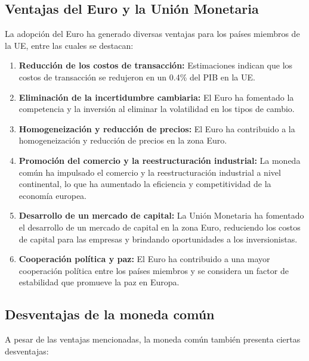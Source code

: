\documentclass[
  jou,
  floatsintext,
  longtable,
  a4paper,
  nolmodern,
  notxfonts,
  notimes,
  12pt,
  colorlinks=true,linkcolor=blue,citecolor=blue,urlcolor=blue]{apa7}
\begin{document}
\subsection{Ventajas del Euro y la Unión
Monetaria}\label{ventajas-del-euro-y-la-uniuxf3n-monetaria}

La adopción del Euro ha generado diversas ventajas para los países
miembros de la UE, entre las cuales se destacan:

\begin{enumerate}
\def\labelenumi{\arabic{enumi}.}
\item
  \textbf{Reducción de los costos de transacción:} Estimaciones indican
  que los costos de transacción se redujeron en un 0.4\% del PIB en la
  UE.
\item
  \textbf{Eliminación de la incertidumbre cambiaria:} El Euro ha
  fomentado la competencia y la inversión al eliminar la volatilidad en
  los tipos de cambio.
\item
  \textbf{Homogeneización y reducción de precios:} El Euro ha
  contribuido a la homogeneización y reducción de precios en la zona
  Euro.
\item
  \textbf{Promoción del comercio y la reestructuración industrial:} La
  moneda común ha impulsado el comercio y la reestructuración industrial
  a nivel continental, lo que ha aumentado la eficiencia y
  competitividad de la economía europea.
\item
  \textbf{Desarrollo de un mercado de capital:} La Unión Monetaria ha
  fomentado el desarrollo de un mercado de capital en la zona Euro,
  reduciendo los costos de capital para las empresas y brindando
  oportunidades a los inversionistas.
\item
  \textbf{Cooperación política y paz:} El Euro ha contribuido a una
  mayor cooperación política entre los países miembros y se considera un
  factor de estabilidad que promueve la paz en Europa.
\end{enumerate}

\subsection{Desventajas de la moneda
común}\label{desventajas-de-la-moneda-comuxfan}

A pesar de las ventajas mencionadas, la moneda común también presenta
ciertas desventajas:
\end{document}
